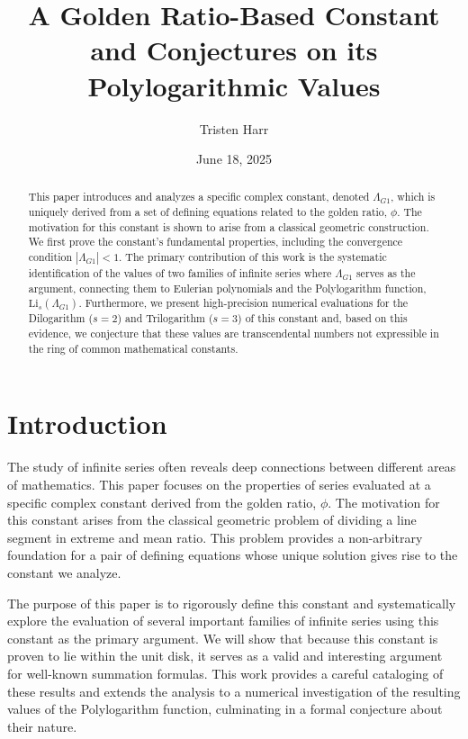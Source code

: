 \documentclass{amsart}
\theoremstyle{plain}
\theoremstyle{definition}
\theoremstyle{remark}
\newcommand{\LambdaG}{\Lambda_{G1}}
\begin{document}
\title[A Golden Ratio Constant and its Polylogarithmic Values]{A Golden Ratio-Based Constant and Conjectures on its Polylogarithmic Values}
\author{Tristen Harr}
\date{June 18, 2025}

\begin{abstract}
This paper introduces and analyzes a specific complex constant, denoted $\Lambda_{G1}$, which is uniquely derived from a set of defining equations related to the golden ratio, $\phi$. The motivation for this constant is shown to arise from a classical geometric construction. We first prove the constant's fundamental properties, including the convergence condition $|\LambdaG| < 1$. The primary contribution of this work is the systematic identification of the values of two families of infinite series where $\LambdaG$ serves as the argument, connecting them to Eulerian polynomials and the Polylogarithm function, $\mathrm{Li}_s(\LambdaG)$. Furthermore, we present high-precision numerical evaluations for the Dilogarithm ($s=2$) and Trilogarithm ($s=3$) of this constant and, based on this evidence, we conjecture that these values are transcendental numbers not expressible in the ring of common mathematical constants.
\end{abstract}

\maketitle

\section{Introduction}
The study of infinite series often reveals deep connections between different areas of mathematics. This paper focuses on the properties of series evaluated at a specific complex constant derived from the golden ratio, $\phi$. The motivation for this constant arises from the classical geometric problem of dividing a line segment in extreme and mean ratio. This problem provides a non-arbitrary foundation for a pair of defining equations whose unique solution gives rise to the constant we analyze.

The purpose of this paper is to rigorously define this constant and systematically explore the evaluation of several important families of infinite series using this constant as the primary argument. We will show that because this constant is proven to lie within the unit disk, it serves as a valid and interesting argument for well-known summation formulas. This work provides a careful cataloging of these results and extends the analysis to a numerical investigation of the resulting values of the Polylogarithm function, culminating in a formal conjecture about their nature.
\end{document}
